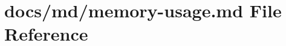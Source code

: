 \hypertarget{memory-usage_8md}{}\section{docs/md/memory-\/usage.md File Reference}
\label{memory-usage_8md}
